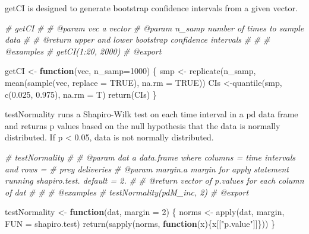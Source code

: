 \documentclass[
]{article}
\newenvironment{Shaded}{\begin{snugshade}}{\end{snugshade}}
\newcommand{\AttributeTok}[1]{\textcolor[rgb]{0.77,0.63,0.00}{#1}}
\newcommand{\CommentTok}[1]{\textcolor[rgb]{0.56,0.35,0.01}{\textit{#1}}}
\newcommand{\ConstantTok}[1]{\textcolor[rgb]{0.00,0.00,0.00}{#1}}
\newcommand{\ControlFlowTok}[1]{\textcolor[rgb]{0.13,0.29,0.53}{\textbf{#1}}}
\newcommand{\DecValTok}[1]{\textcolor[rgb]{0.00,0.00,0.81}{#1}}
\newcommand{\FloatTok}[1]{\textcolor[rgb]{0.00,0.00,0.81}{#1}}
\newcommand{\FunctionTok}[1]{\textcolor[rgb]{0.00,0.00,0.00}{#1}}
\newcommand{\NormalTok}[1]{#1}
\newcommand{\OtherTok}[1]{\textcolor[rgb]{0.56,0.35,0.01}{#1}}
\newcommand{\StringTok}[1]{\textcolor[rgb]{0.31,0.60,0.02}{#1}}
\begin{document}
getCI is designed to generate bootstrap confidence intervals from a
given vector.

\begin{Shaded}
\begin{Highlighting}[]
\CommentTok{\#\textquotesingle{} getCI}
\CommentTok{\#\textquotesingle{} }
\CommentTok{\#\textquotesingle{} @param vec a vector}
\CommentTok{\#\textquotesingle{} @param n\_samp number of times to sample data}
\CommentTok{\#\textquotesingle{}}
\CommentTok{\#\textquotesingle{} @return upper and lower bootstrap confidence intervals}
\CommentTok{\#\textquotesingle{} }
\CommentTok{\#\textquotesingle{}}
\CommentTok{\#\textquotesingle{} @examples}
\CommentTok{\#\textquotesingle{}    getCI(1:20, 2000)}
\CommentTok{\#\textquotesingle{} @export}

\NormalTok{getCI }\OtherTok{\textless{}{-}} \ControlFlowTok{function}\NormalTok{(vec, }\AttributeTok{n\_samp=}\DecValTok{1000}\NormalTok{) \{}
\NormalTok{  smp }\OtherTok{\textless{}{-}} \FunctionTok{replicate}\NormalTok{(n\_samp, }\FunctionTok{mean}\NormalTok{(}\FunctionTok{sample}\NormalTok{(vec, }\AttributeTok{replace =} \ConstantTok{TRUE}\NormalTok{), }\AttributeTok{na.rm =} \ConstantTok{TRUE}\NormalTok{))}
\NormalTok{  CIs }\OtherTok{\textless{}{-}}\FunctionTok{quantile}\NormalTok{(smp, }\FunctionTok{c}\NormalTok{(}\FloatTok{0.025}\NormalTok{, }\FloatTok{0.975}\NormalTok{), }\AttributeTok{na.rm =}\NormalTok{ T)}
  \FunctionTok{return}\NormalTok{(CIs)}
\NormalTok{\}}
\end{Highlighting}
\end{Shaded}

testNormality runs a Shapiro-Wilk test on each time interval in a pd
data frame and returns p values based on the null hypothesis that the
data is normally distributed. If p \textless{} 0.05, data is not
normally distributed.

\begin{Shaded}
\begin{Highlighting}[]
\CommentTok{\#\textquotesingle{} testNormality}
\CommentTok{\#\textquotesingle{} }
\CommentTok{\#\textquotesingle{} @param dat a data.frame where columns = time intervals and rows = \# prey deliveries}
\CommentTok{\#\textquotesingle{} @param margin.a margin for apply statement running shapiro.test. default = 2.}
\CommentTok{\#\textquotesingle{}}
\CommentTok{\#\textquotesingle{} @return vector of p.values for each column of dat}
\CommentTok{\#\textquotesingle{} }
\CommentTok{\#\textquotesingle{}}
\CommentTok{\#\textquotesingle{} @examples}
\CommentTok{\#\textquotesingle{}    testNormality(pdM\_inc, 2)}
\CommentTok{\#\textquotesingle{} @export}

\NormalTok{testNormality }\OtherTok{\textless{}{-}} \ControlFlowTok{function}\NormalTok{(dat, }\AttributeTok{margin =} \DecValTok{2}\NormalTok{) \{}
\NormalTok{  norms }\OtherTok{\textless{}{-}} \FunctionTok{apply}\NormalTok{(dat, margin, }\AttributeTok{FUN =}\NormalTok{ shapiro.test)}
  \FunctionTok{return}\NormalTok{(}\FunctionTok{sapply}\NormalTok{(norms, }\ControlFlowTok{function}\NormalTok{(x)\{x[[}\StringTok{"p.value"}\NormalTok{]]\}))}
\NormalTok{\}}
\end{Highlighting}
\end{Shaded}
\end{document}
